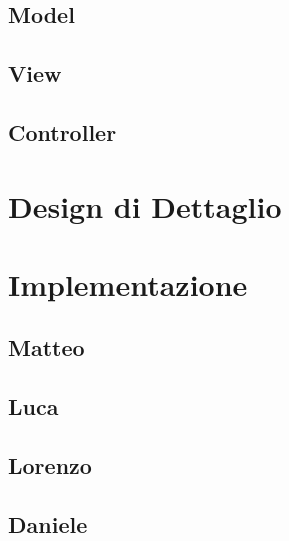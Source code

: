 \documentclass{article}
\begin{document}
        \subsection{Model}

        \subsection{View}

        \subsection{Controller}

	\newpage

    \section{Design di Dettaglio}

	\newpage

    \section{Implementazione}

        \subsection{Matteo}

        \subsection{Luca}

        \subsection{Lorenzo}

        \subsection{Daniele}
\end{document}
